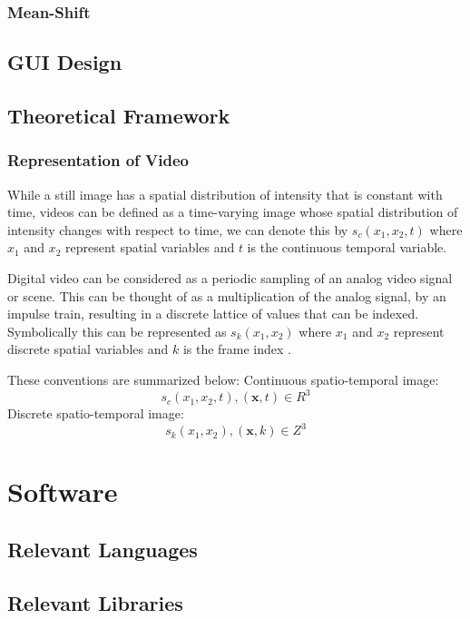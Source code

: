 \subsubsection{Mean-Shift} \label{literature_review_mean_shift}


\subsection{GUI Design}


\subsection{Theoretical Framework}
\subsubsection{Representation of Video}
While a still image has a spatial distribution of intensity that is constant
with time, videos can be defined as a time-varying image whose spatial
distribution of intensity changes with respect to time, we can denote this by
$s_c(x_1,x_2,t)$ where $x_1$ and $x_2$ represent spatial variables and $t$ is
the continuous temporal variable.

Digital video can be considered as a periodic sampling of an analog video signal
or scene. This can be thought of as a multiplication of the analog signal, by an
impulse train, resulting in a discrete lattice of values that can be indexed.
Symbolically this can be represented as $s_k(x_1,x_2)$ where $x_1$ and
$x_2$ represent discrete spatial variables and $k$ is the frame index
\cite{Tekalp2014}. 

These conventions are summarized below: \newline
Continuous spatio-temporal image:
$$s_c(x_1,x_2,t), (\textbf{x},t) \in R^3$$ \newline 
Discrete spatio-temporal image:
$$s_k(x_1,x_2), (\textbf{x},k) \in Z^3$$ 
 

\section{Software}

\subsection{Relevant Languages}

\subsection{Relevant Libraries}




